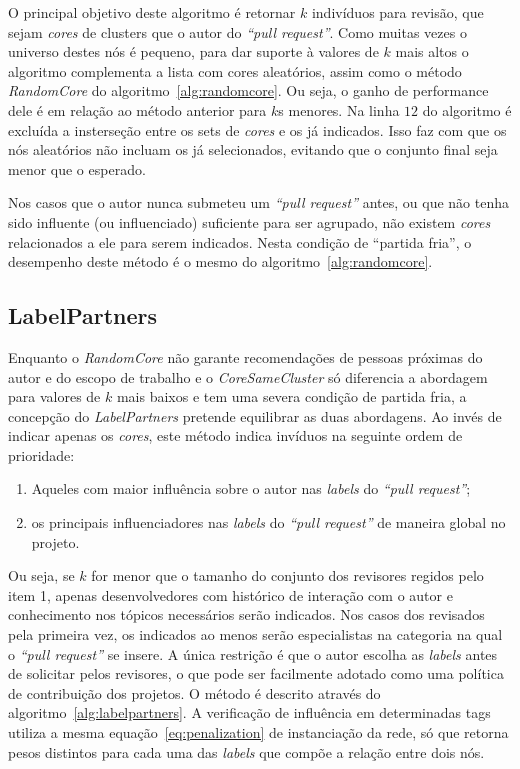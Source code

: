 \documentclass[12pt,openany,oneside,a4paper,english,brazil]{abntbibufjf}
\begin{document}
  O principal objetivo deste algoritmo é retornar $k$ indivíduos para revisão, que sejam \textit{cores} de clusters que o autor do \textit{``pull request''}. Como muitas vezes o universo destes nós é pequeno, para dar suporte à valores de $k$ mais altos o algoritmo complementa a lista com cores aleatórios, assim como o método \textit{RandomCore} do algoritmo~\ref{alg:randomcore}. Ou seja, o ganho de performance dele é em relação ao método anterior para $k$s menores. Na linha $12$ do algoritmo é excluída a insterseção entre os sets de \textit{cores} e os já indicados. Isso faz com que os nós aleatórios não incluam os já selecionados, evitando que o conjunto final seja menor que o esperado.

   Nos casos que o autor nunca submeteu um \textit{``pull request''} antes, ou que não tenha sido influente (ou influenciado) suficiente para ser agrupado, não existem \textit{cores} relacionados a ele para serem indicados. Nesta condição de ``partida fria'', o desempenho deste método é o mesmo do algoritmo~\ref{alg:randomcore}.

  \subsection{LabelPartners}
  Enquanto o \textit{RandomCore} não garante recomendações de pessoas próximas do autor e do escopo de trabalho e o \textit{CoreSameCluster} só diferencia a abordagem para valores de $k$ mais baixos e tem uma severa condição de partida fria, a concepção do \textit{LabelPartners} pretende equilibrar as duas abordagens. Ao invés de indicar apenas os \textit{cores}, este método indica invíduos na seguinte ordem de prioridade:

\begin{enumerate}
  \item Aqueles com maior influência sobre o autor nas \textit{labels} do \textit{``pull request''};
  \item os principais influenciadores nas \textit{labels} do \textit{``pull request''} de maneira global no projeto.
\end{enumerate}

  Ou seja, se $k$ for menor que o tamanho do conjunto dos revisores regidos pelo item 1, apenas desenvolvedores com histórico de interação com o autor e conhecimento nos tópicos necessários serão indicados. Nos casos dos revisados pela primeira vez, os indicados ao menos serão especialistas na categoria na qual o \textit{``pull request''} se insere. A única restrição é que o autor escolha as \textit{labels} antes de solicitar pelos revisores, o que pode ser facilmente adotado como uma política de contribuição dos projetos. O método é descrito através do algoritmo~\ref{alg:labelpartners}. A verificação de influência em determinadas tags utiliza a mesma equação~\ref{eq:penalization} de instanciação da rede, só que retorna pesos distintos para cada uma das \textit{labels} que compõe a relação entre dois nós.
\end{document}
